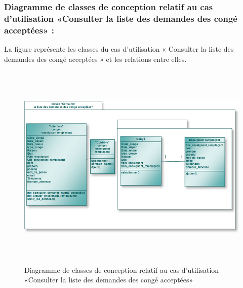 \documentclass[12 pt ]{report}
\begin{document}
\subsubsection{Diagramme de classes de conception relatif au cas d’utilisation «Consulter la liste des demandes des congé acceptées» :}
La figure  représente les classes du cas d’utilisation « Consulter la liste des demandes des congé acceptées » et les relations entre elles.
\begin{figure}[h]
 \begin{center}
\includegraphics[width= 14 cm ,height= 10cm]{con_con_acc.PNG}
\caption{Diagramme de classes de conception relatif au cas d’utilisation «Consulter la liste des demandes des congé acceptées» }

\end{center}
\end{figure}
\newpage
\end{document}
